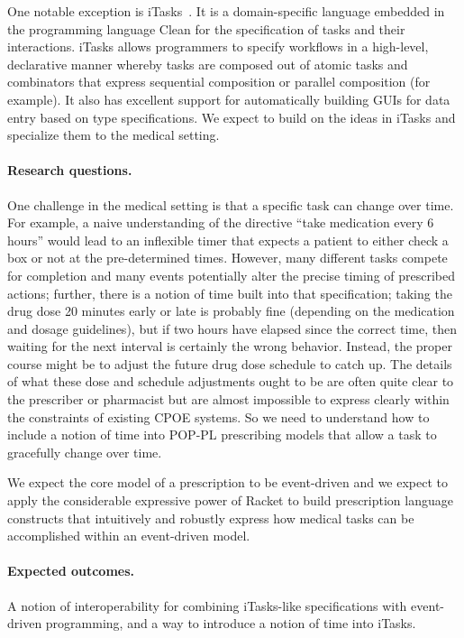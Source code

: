 One notable exception is iTasks~\citep{itasks}. It is a
domain-specific language embedded in the programming language Clean
for the specification of tasks and their interactions. iTasks allows
programmers to specify workflows in a high-level, declarative manner
whereby tasks are composed out of atomic tasks and combinators that
express sequential composition or parallel composition (for
example). It also has excellent support for automatically building
GUIs for data entry based on type specifications. We expect to build
on the ideas in iTasks and specialize them to the medical setting.

\paragraph{Research questions.} One challenge in the medical
setting is that a specific task can change over time. For example, a
naive understanding of the directive ``take medication every 6
hours'' would lead to an inflexible timer that expects a patient to
either check a box or not at the pre-determined times. However, many different tasks compete for completion and many events potentially alter the precise timing of prescribed actions; further,
there is a notion of time built into that specification; taking the drug
dose 20 minutes early or late is probably fine (depending on the
medication and dosage guidelines), but if two hours have elapsed
since the correct time, then waiting for the next interval is
certainly the wrong behavior. Instead, the proper course might be to adjust the future drug dose schedule to catch up. The details of what these dose and schedule adjustments ought to be are often quite clear to the prescriber or pharmacist but are almost impossible to express clearly within the constraints of existing CPOE systems. So we need to understand how to include a notion of time into POP-PL prescribing models that allow a task to gracefully change over time.

We expect the core model of a prescription to be event-driven and we expect to apply the considerable expressive power of Racket to build prescription language constructs that intuitively and robustly express how medical tasks can be accomplished within an event-driven model.

\paragraph{Expected outcomes.} A notion of interoperability for
combining iTasks-like specifications with event-driven programming,
and a way to introduce a notion of time into iTasks.
